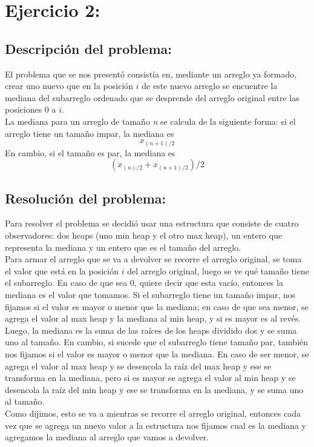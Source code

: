 \documentclass{article}
\begin{document}
	\section{Ejercicio 2:}
		\subsection{Descripci\'on del problema:}
		El problema que se nos present\'o consist\'ia en, mediante un arreglo ya formado, crear uno nuevo que en la posici\'on $i$ de este nuevo arreglo se encuentre la mediana del subarreglo ordenado que se desprende del arreglo original entre las posiciones 0 a $i$.
		\\ La mediana para un arreglo de tama\~no \textit{n}  se calcula de la siguiente forma: si el arreglo tiene un tama\~no impar, la mediana es \[\textit{x}_{(n+1)/2}\] En cambio, si el tama\~no es par, la mediana es \[(\textit{x}_{(n)/2}+\textit{x}_{(n+1)/2})/2\]
		\subsection{Resoluci\'on del problema:}
		Para resolver el problema se decidi\'o usar una estructura que consiste de cuatro observadores: dos heaps (uno min heap y el otro max heap), un entero que representa la mediana y un entero que es el tamaño del arreglo.
		\\ Para armar el arreglo que se va a devolver se recorre el arreglo original, se toma el valor que est\'a en la posici\'on $i$ del arreglo original, luego se ve qu\'e tama\~no tiene el subarreglo. En caso de que sea 0, quiere decir que esta vac\'io, entonces la mediana es el valor que tomamos. Si el subarreglo tiene un tama\~no impar, nos fijamos si el valor es mayor o menor que la mediana; en caso de que sea menor, se agrega el valor al max heap y la mediana al min heap, y si es mayor es al rev\'es.
		\\ Luego, la mediana es la suma de las ra\'ices de los heaps dividido dos y se suma uno al tama\~no. En cambio, si sucede que el subarreglo tiene tama\~no par, tambi\'en nos fijamos si el valor es mayor o menor que la mediana. En caso de ser menor, se agrega el valor al max heap y se desencola la ra\'iz del max heap y ese se transforma en la mediana, pero si es mayor se agrega el valor al min heap y se desencola la ra\'iz del min heap y ese se transforma en la mediana, y se suma uno al tama\~no.
		\\Como dijimos, esto se va a mientras se recorre el arreglo original, entonces cada vez que se agrega un nuevo valor a la estructura nos fijamos cual es la mediana y agregamos la mediana al arreglo que vamos a devolver.
\end{document}
